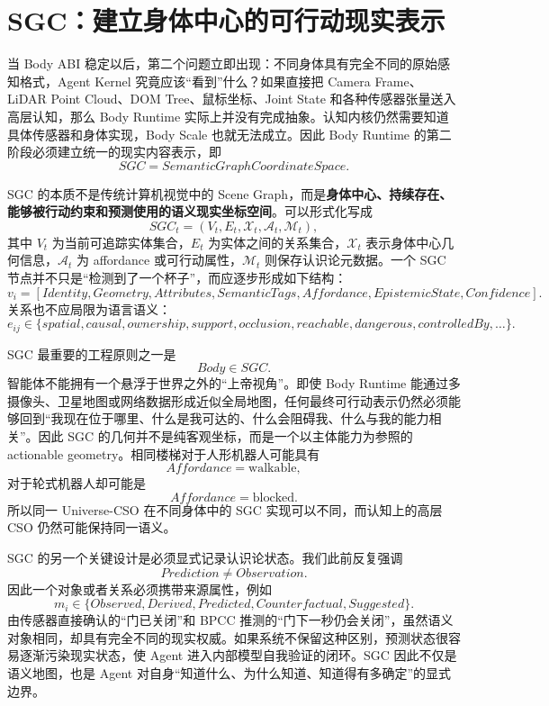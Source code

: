\section{SGC：建立身体中心的可行动现实表示}

当 Body ABI 稳定以后，第二个问题立即出现：不同身体具有完全不同的原始感知格式，Agent Kernel 究竟应该“看到”什么？如果直接把 Camera Frame、LiDAR Point Cloud、DOM Tree、鼠标坐标、Joint State 和各种传感器张量送入高层认知，那么 Body Runtime 实际上并没有完成抽象。认知内核仍然需要知道具体传感器和身体实现，Body Scale 也就无法成立。因此 Body Runtime 的第二阶段必须建立统一的现实内容表示，即
\[
\boxed{
SGC=SemanticGraphCoordinateSpace.
}
\]

SGC 的本质不是传统计算机视觉中的 Scene Graph，而是\textbf{身体中心、持续存在、能够被行动约束和预测使用的语义现实坐标空间}。可以形式化写成
\[
SGC_t
=
\left(
V_t,
E_t,
\mathcal X_t,
\mathcal A_t,
\mathcal M_t
\right),
\]
其中 $V_t$ 为当前可追踪实体集合，$E_t$ 为实体之间的关系集合，$\mathcal X_t$ 表示身体中心几何信息，$\mathcal A_t$ 为 affordance 或可行动属性，$\mathcal M_t$ 则保存认识论元数据。一个 SGC 节点并不只是“检测到了一个杯子”，而应逐步形成如下结构：
\[
v_i=
\left[
Identity,
Geometry,
Attributes,
SemanticTags,
Affordance,
EpistemicState,
Confidence
\right].
\]
关系也不应局限为语言语义：
\[
e_{ij}
\in
\{
spatial,
causal,
ownership,
support,
occlusion,
reachable,
dangerous,
controlledBy,\ldots
\}.
\]

SGC 最重要的工程原则之一是
\[
\boxed{
Body\in SGC.
}
\]
智能体不能拥有一个悬浮于世界之外的“上帝视角”。即使 Body Runtime 能通过多摄像头、卫星地图或网络数据形成近似全局地图，任何最终可行动表示仍然必须能够回到“我现在位于哪里、什么是我可达的、什么会阻碍我、什么与我的能力相关”。因此 SGC 的几何并不是纯客观坐标，而是一个以主体能力为参照的 actionable geometry。相同楼梯对于人形机器人可能具有
\[
Affordance=\text{walkable},
\]
对于轮式机器人却可能是
\[
Affordance=\text{blocked}.
\]
所以同一 Universe-CSO 在不同身体中的 SGC 实现可以不同，而认知上的高层 CSO 仍然可能保持同一语义。

SGC 的另一个关键设计是必须显式记录认识论状态。我们此前反复强调
\[
Prediction\neq Observation.
\]
因此一个对象或者关系必须携带来源属性，例如
\[
m_i\in
\{
Observed,
Derived,
Predicted,
Counterfactual,
Suggested
\}.
\]
由传感器直接确认的“门已关闭”和 BPCC 推测的“门下一秒仍会关闭”，虽然语义对象相同，却具有完全不同的现实权威。如果系统不保留这种区别，预测状态很容易逐渐污染现实状态，使 Agent 进入内部模型自我验证的闭环。SGC 因此不仅是语义地图，也是 Agent 对自身“知道什么、为什么知道、知道得有多确定”的显式边界。

